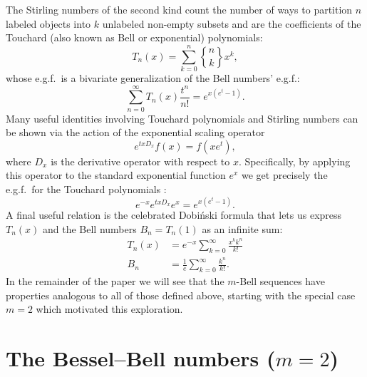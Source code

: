\documentclass[a4paper]{amsart}
\numberwithin{equation}{section}
\begin{document}
The Stirling numbers of the second kind count the number of ways to partition $n$ labeled objects into $k$ unlabeled non-empty subsets and are the coefficients of the Touchard (also known as Bell or exponential) polynomials:
%
\begin{equation}
    T_n(x) = \sum_{k=0}^{n} \genfrac\{\}{0pt}{}{n}{k} x^k,
\end{equation}
%
whose e.g.f.\ is a bivariate generalization of the Bell numbers' e.g.f.:
%
\begin{equation}
    \sum_{n=0}^{\infty} T_n(x) \frac{t^n}{n!} = e^{x(e^t-1)}.
\end{equation}
%
Many useful identities involving Touchard polynomials and Stirling numbers can be shown via the action of the exponential scaling operator
%
\begin{equation}\label{eq-scaling-operator}
    e^{txD_x}f(x)=f(xe^t),
\end{equation}
%
where $D_x$ is the derivative operator with respect to $x$. Specifically, by applying this operator to the standard exponential function $e^x$ we get precisely the e.g.f.\ for the Touchard polynomials \cite{dattoliTouchardPolynomialsGeneralized2010}:
%
\[
e^{-x}e^{txD_x}e^x = e^{x(e^t-1)}.
\]
%
A final useful relation is the celebrated Dobi\'nski formula \cite{wilfGeneratingfunctionologyThirdEdition2005} that lets us express $T_n(x)$ and the Bell numbers $B_n = T_n(1)$ as an infinite sum:
%
\begin{equation}\label{eq-bell-dobinski}
\begin{aligned}
T_n(x) & =e^{-x}\sum_{k=0}^{\infty}\frac{x^k k^n}{k!} \\
B_n & = \frac{1}{e}\sum_{k=0}^{\infty}\frac{k^n}{k!}.
\end{aligned}
\end{equation}
%
In the remainder of the paper we will see that the $m$-Bell sequences have properties analogous to all of those defined above, starting with the special case $m = 2$ which motivated this exploration.

\section{The Bessel--Bell numbers ($m=2$)}\label{sec-m2}
\end{document}
